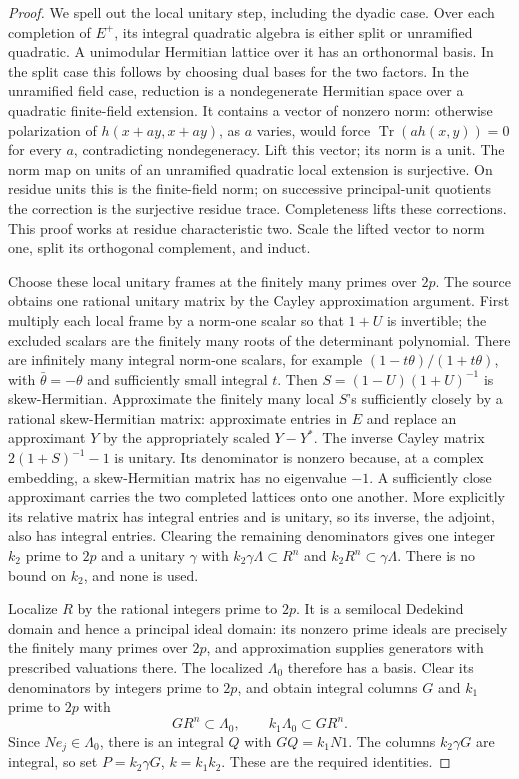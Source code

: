\begin{proof}
We spell out the local unitary step, including the dyadic case.
Over each completion of \(E^+\), its integral quadratic algebra is
either split or unramified quadratic.
A unimodular Hermitian lattice over it has an orthonormal basis.
In the split case this follows by choosing dual bases for the two
factors.
In the unramified field case, reduction is a nondegenerate Hermitian
space over a quadratic finite-field extension.
It contains a vector of nonzero norm: otherwise polarization of
\(h(x+ay,x+ay)\), as \(a\) varies, would force
\(\operatorname{Tr}(a h(x,y))=0\) for every \(a\), contradicting
nondegeneracy.
Lift this vector; its norm is a unit.
The norm map on units of an unramified quadratic local extension is
surjective.  On residue units this is the finite-field norm; on
successive principal-unit quotients the correction is the
surjective residue trace.  Completeness lifts these corrections.
This proof works at residue characteristic two.
Scale the lifted vector to norm one, split its orthogonal
complement, and induct.

Choose these local unitary frames at the finitely many primes over
\(2p\).  The source obtains one rational unitary matrix by the
Cayley approximation argument.
First multiply each local frame by a norm-one scalar so that
\(1+U\) is invertible; the excluded scalars are the finitely many
roots of the determinant polynomial.
There are infinitely many integral norm-one scalars, for example
\((1-t\theta)/(1+t\theta)\), with
\(\bar\theta=-\theta\) and sufficiently small integral \(t\).
Then \(S=(1-U)(1+U)^{-1}\) is skew-Hermitian.
Approximate the finitely many local \(S\)'s sufficiently closely by
a rational skew-Hermitian matrix: approximate entries in \(E\) and
replace an approximant \(Y\) by the appropriately scaled
\(Y-Y^*\).
The inverse Cayley matrix
\(2(1+S)^{-1}-1\) is unitary.
Its denominator is nonzero because, at a complex embedding, a
skew-Hermitian matrix has no eigenvalue \(-1\).
A sufficiently close approximant carries the two completed
lattices onto one another.  More explicitly its relative matrix
has integral entries and is unitary, so its inverse, the adjoint,
also has integral entries.
Clearing the remaining denominators gives one integer \(k_2\)
prime to \(2p\) and a unitary \(\gamma\) with
\(k_2\gamma\Lambda\subset R^n\) and
\(k_2R^n\subset\gamma\Lambda\).
There is no bound on \(k_2\), and none is used.

Localize \(R\) by the rational integers prime to \(2p\).
It is a semilocal Dedekind domain and hence a principal ideal
domain: its nonzero prime ideals are precisely the finitely many
primes over \(2p\), and approximation supplies generators with
prescribed valuations there.
The localized \(\Lambda_0\) therefore has a basis.
Clear its denominators by integers prime to \(2p\), and obtain
integral columns \(G\) and \(k_1\) prime to \(2p\) with
\[
       GR^n\subset\Lambda_0,\qquad k_1\Lambda_0\subset GR^n .
\]
Since \(Ne_j\in\Lambda_0\), there is an integral \(Q\) with
\(GQ=k_1N1\).
The columns \(k_2\gamma G\) are integral, so set
\(P=k_2\gamma G\), \(k=k_1k_2\).
These are the required identities.


\end{proof}
